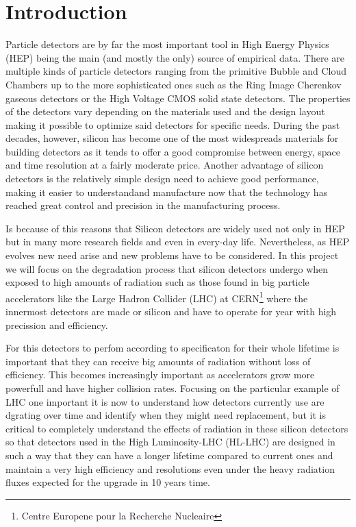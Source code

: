 \chapter{Introduction}

Particle detectors are by far the most important tool in High Energy Physics (HEP) being the main (and mostly the only) source of empirical data. There are multiple kinds of particle detectors ranging from the primitive Bubble and Cloud Chambers up to the more sophisticated ones such as the Ring Image Cherenkov gaseous detectors or the High Voltage CMOS solid state detectors. The properties of the detectors vary depending on the materials used and the design layout making it possible to optimize said detectors for specific needs. During the past decades, however, silicon has become one of the most widespreads materials for building detectors as it tends to offer a good compromise between energy, space and time resolution at a fairly moderate price. Another advantage of silicon detectors is the relatively simple design need to achieve good performance, making it easier to understandand manufacture now that the technology has reached great control and precision in the manufacturing process.

Is because of this reasons that Silicon detectors are widely used not only in HEP but in many more research fields and even in every-day life. Nevertheless, as HEP evolves new need arise and new problems have to be considered. In this project we will focus on the degradation process that silicon detectors undergo when exposed to high amounts of radiation such as those found in big particle accelerators like the Large Hadron Collider (LHC) at CERN\footnote{Centre Europene pour la Recherche Nucleaire} where the innermost detectors are made or silicon and have to operate for year with high precission and efficiency. 

For this detectors to perfom according to specificaton for their whole lifetime is important that they can receive big amounts of radiation without loss of efficiency. This becomes increasingly important as accelerators grow more powerfull and have higher collision rates. Focusing on the particular example of LHC one important it is now to understand how detectors currently use are dgrating over time and identify when they might need replacement, but it is critical to completely understand the effects of radiation in these silicon detectors so that detectors used in the High Luminosity-LHC (HL-LHC) are designed in such a way that they can have a longer lifetime compared to current ones and maintain a very high efficiency and resolutions even under the heavy radiation fluxes expected for the upgrade in 10 years time.

